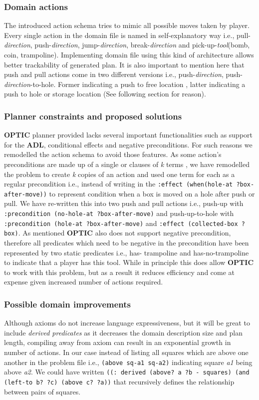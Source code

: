 \documentclass[letterpaper]{article} %
\begin{document}
\subsubsection{Domain actions}
The introduced action schema tries to mimic all possible moves taken by player. Every single action in the domain file is named in self-explanatory way i.e., pull-\emph{direction}, push-\emph{direction}, jump-\emph{direction}, break-\emph{direction} and pick-up-\emph{tool}(bomb, coin, trampoline). Implementing domain file using this kind of architecture allows better trackability of generated plan. It is also important to mention here that push and pull actions come in two different versions i.e., push-\emph{direction}, push-\emph{direction}-to-hole. Former indicating a push to free location , latter indicating a push to hole or storage location (See following section for reason).

\subsubsection{Planner constraints and proposed solutions}
\textbf{OPTIC} planner provided lacks several important functionalities such as support for the \textbf{ADL}, conditional effects and negative preconditions. For such reasons we remodelled the action schema to avoid those features. As some action’s preconditions are made up of a single or clauses of \emph{k} terms \cite{haslum_2019}, we have remodelled the problem to create \emph{k} copies of an action and used one term for each as a regular precondition i.e., instead of writing in the \texttt{:effect (when(hole-at ?box-after-move))} to represent condition when a box is moved on a hole after push or pull. We have re-written this into two push and pull actions i.e., push-up with \texttt{:precondition (no-hole-at ?box-after-move)} and push-up-to-hole with \texttt{:precondition (hole-at ?box-after-move)} and \texttt{:effect (collected-box ?box)}. As mentioned \textbf{OPTIC}  also does not support negative precondition, therefore all predicates which need to be negative in the precondition have been represented by two static predicates i.e., has- trampoline and has-no-trampoline to indicate that a player has this tool. While in principle this does allow \textbf{OPTIC} to work with this problem, but as a result it reduces efficiency and come at expense given increased number of actions required.

\subsubsection{Possible domain improvements}
Although axioms do not increase language expressiveness, but it will be great to include \emph{derived predicates} as it decreases the domain description size and plan length, compiling away from axiom can result in an exponential growth in number of actions. In our case instead of listing all squares which are above one another in the problem file i.e., \texttt{(above sq-a1 sq-a2)} indicating square \emph{a1} being above \emph{a2}. We could have written \texttt{((: derived (above? a ?b - squares) (and (left-to b?  ?c) (above c? ?a))} that recursively defines the relationship between pairs of squares.
\end{document}

